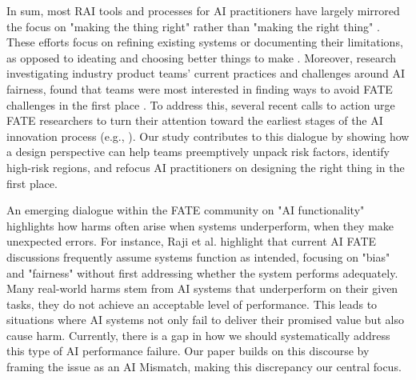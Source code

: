 In sum, most RAI tools and processes for AI practitioners have largely mirrored the focus on "making the thing right" rather than "making the right thing" \cite{buxton2010sketching}. These efforts focus on refining existing systems or documenting their limitations, as opposed to ideating and choosing better things to make \cite{holstein2019improving, wong2023seeing}. Moreover, research investigating industry product teams' current practices and challenges around AI fairness, found that teams were most interested in finding ways to avoid FATE challenges in the first place \cite{deng2023understanding, holstein2019improving, lee2024don}. To address this, several recent calls to action urge FATE researchers to turn their attention toward the earliest stages of the AI innovation process (e.g., \cite{boyarskaya2020overcoming, holstein2019improving, passi2019problem, Raji2022-ls, wang2023designing}). Our study contributes to this dialogue by showing how a design perspective can help teams preemptively unpack risk factors, identify high-risk regions, and refocus AI practitioners on designing the right thing in the first place.

An emerging dialogue within the FATE community on "AI functionality" highlights how harms often arise when systems underperform, when they make unexpected errors. For instance, Raji et al. \cite{Raji2022-ls} 
highlight that current AI FATE discussions frequently assume systems function as intended, focusing on "bias" and "fairness" without first addressing whether the system performs adequately.
Many real-world harms stem from AI systems that underperform on their given tasks, they do not achieve an acceptable level of performance. This leads to situations where AI systems not only fail to deliver their promised value but also cause harm. Currently, there is a gap in how we should systematically address this type of AI performance failure. Our paper builds on this discourse by framing the issue as an AI Mismatch, making this discrepancy our central focus.

